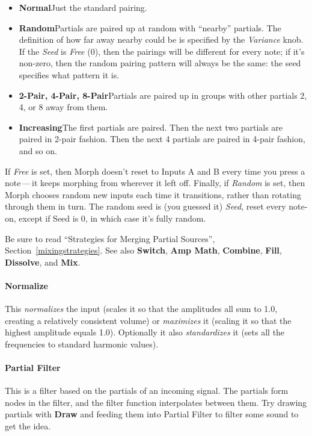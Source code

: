 \documentclass{article}
\begin{document}
\begin{itemize}
\item {\bf Normal}\qquad Just the standard pairing.
\item {\bf Random}\qquad Partials are paired up at random with ``nearby'' partials.  The definition of how far away nearby could be is specified by the {\it Variance} knob.  If the {\it Seed} is {\it Free} (0), then the pairings will be different for every note; if it's non-zero, then the random pairing pattern will always be the same: the seed specifies what pattern it is.
\item {\bf 2-Pair, 4-Pair, 8-Pair}\qquad Partials are paired up in groups with other partials 2, 4, or 8 away from them.
\item {\bf Increasing}\qquad The first partials are paired.  Then the next two partials are paired in 2-pair fashion.  Then the next 4 partials are paired in 4-pair fashion, and so on.
\end{itemize}



If {\it Free} is set, then Morph doesn't reset to Inputs A and B every time you press a note\,---\,it keeps morphing from wherever it left off.  Finally, if {\it Random} is set, then Morph chooses random new inputs each time it transitions, rather than rotating through them in turn. The random seed is (you guessed it) {\it Seed}, reset every note-on, except if Seed is 0, in which case it's fully random.  

Be sure to read ``Strategies for Merging Partial Sources'', Section~\ref{mixingstrategies}.  See also {\bf Switch}, {\bf Amp Math},  {\bf Combine}, {\bf Fill}, {\bf Dissolve}, and {\bf Mix}.

\paragraph{Normalize} This {\it normalizes} the input (scales it so that the amplitudes all sum to 1.0, creating a relatively consistent volume) or {\it maximizes} it (scaling it so that the highest amplitude equals 1.0).  Optionally it also {\it standardizes} it (sets all the frequencies to standard harmonic values).

\paragraph{Partial Filter} This is a filter based on the partials of an incoming signal.  The partials form nodes in the filter, and the filter function interpolates between them.  Try drawing partials with {\bf Draw} and feeding them into Partial Filter to filter some sound to get the idea.  
\end{document}
